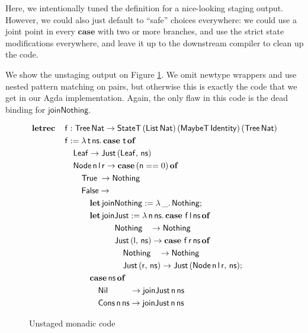 \documentclass[acmsmall,screen]{acmart}
\newcommand{\msf}[1]{{\mathsf{#1}}}
\newcommand{\mbf}[1]{{\mathbf{#1}}}
\newcommand{\ind}{\hspace{1em}}
\newcommand{\lam}{\lambda\,}
\newcommand{\letrec}{\mbf{letrec}\,}
\newcommand{\of}{\mbf{of}\,}
\newcommand{\letdef}{\mbf{let\,}}
\newcommand{\vn}{\mathsf{n}}
\newcommand{\vf}{\mathsf{f}}
\newcommand{\vt}{\mathsf{t}}
\newcommand{\vr}{\mathsf{r}}
\newcommand{\vl}{\mathsf{l}}
\newcommand{\vns}{\mathsf{ns}}
\newcommand{\List}{\msf{List}}
\newcommand{\Tree}{\msf{Tree}}
\newcommand{\Node}{\msf{Node}}
\newcommand{\Leaf}{\msf{Leaf}}
\newcommand{\Nil}{\msf{Nil}}
\newcommand{\Cons}{\msf{Cons}}
\newcommand{\case}{\mbf{case\,}}
\newcommand{\True}{\msf{True}}
\newcommand{\False}{\msf{False}}
\newcommand{\Nat}{\msf{Nat}}
\newcommand{\MaybeT}{\msf{MaybeT}}
\newcommand{\Nothing}{\msf{Nothing}}
\newcommand{\Just}{\msf{Just}}
\theoremstyle{remark}
\newcommand{\StateT}{\msf{StateT}}
\newcommand{\Identity}{\msf{Identity}}
\begin{document}
Here, we intentionally tuned the definition for a nice-looking staging output.
However, we could also just default to ``safe'' choices everywhere: we could use
a joint point in every $\mbf{case}$ with two or more branches, and use the
strict state modifications everywhere, and leave it up to the downstream compiler
to clean up the code.

We show the unstaging output on Figure \ref{fig:codeout}. We omit newtype
wrappers and use nested pattern matching on pairs, but otherwise this is exactly
the code that we get in our Agda implementation. Again, the only flaw in this
code is the dead binding for $\msf{joinNothing}$.
\begin{figure}\label{fig:codeout}
\begin{alignat*}{4}
  &  \letrec &&\vf : \Tree\,\Nat \to \StateT\,(\List\,\Nat)\,(\MaybeT\,\Identity)\,(\Tree\,\Nat) \\
  &          &&\vf := \lam \vt\,\vns.\, \case\,\vt\,\of\\
  &          &&\ind \Leaf \to \Just\,(\Leaf,\,\vns) \\
  &          &&\ind \Node\,\vn\,\vl\,\vr \to \case (\vn == 0)\,\of\\
  &          &&\ind \ind \True \hspace{0.25em}\to \Nothing \\
  &          &&\ind \ind \False \to \\
  &          &&\ind \ind \ind \letdef \msf{joinNothing} := \lam \_.\,\Nothing;\\
  &          &&\ind \ind \ind \letdef \msf{joinJust} := \lam \vn\,\vns.\,\case\,\vf\,\vl\,\vns\,\of\\
  &          &&\ind \ind \ind \ind \ind \ind \Nothing\hspace{0.9em} \to \Nothing\\
  &          &&\ind \ind \ind \ind \ind \ind \Just\,(\vl,\,\vns) \to \case\,\vf\,\vr\,\vns\,\of\\
  &          &&\ind \ind \ind \ind \ind \ind \ind \Nothing\hspace{.95em} \to \Nothing\\
  &          &&\ind \ind \ind \ind \ind \ind \ind \Just\,(\vr,\,\vns) \to \Just\,(\Node\,\vn\,\vl\,\vr,\,\vns);\\
  &          &&\ind \ind \ind \case \vns\,\of\\
  &          &&\ind \ind \ind \ind \Nil \hspace{2.65em}\to \msf{joinJust}\,\vn\,\vns\\
  &          &&\ind \ind \ind \ind \Cons\,\vn\,\vns \to \msf{joinJust}\,\vn\,\vns
\end{alignat*}
\caption{Unstaged monadic code}
\label{fig:codeout}
\end{figure}
\end{document}
